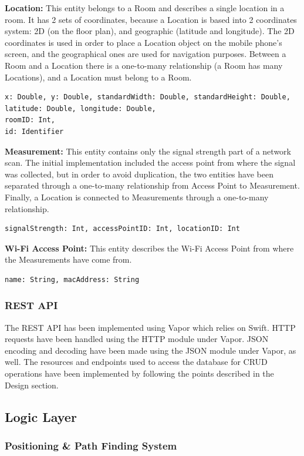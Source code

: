 \noindent
\textbf{Location: }This entity belongs to a Room and describes a single location in a room. It has 2 sets of coordinates, because a Location is based into 2 coordinates system: 2D (on the floor plan), and geographic (latitude and longitude). The 2D coordinates is used in order to place a Location object on the mobile phone's screen, and the geographical ones are used for navigation purposes. Between a Room and a Location there is a one-to-many relationship (a Room has many Locations), and a Location must belong to a Room.
\begin{lstlisting}
x: Double, y: Double, standardWidth: Double, standardHeight: Double,
latitude: Double, longitude: Double,
roomID: Int,
id: Identifier
\end{lstlisting}

\noindent
\textbf{Measurement: }This entity contains only the signal strength part of a network scan. The initial implementation included the access point from where the signal was collected, but in order to avoid duplication, the two entities have been separated through a one-to-many relationship from Access Point to Measurement. Finally, a Location is connected to Measurements through a one-to-many relationship.
\begin{lstlisting}
signalStrength: Int, accessPointID: Int, locationID: Int
\end{lstlisting}

\noindent
\textbf{Wi-Fi Access Point: }This entity describes the Wi-Fi Access Point from where the Measurements have come from.
\begin{lstlisting}
name: String, macAddress: String
\end{lstlisting}

\subsubsection{REST API}
The REST API has been implemented using Vapor which relies on Swift. HTTP requests have been handled using the HTTP module under Vapor. JSON encoding and decoding have been made using the JSON module under Vapor, as well. The resources and endpoints used to access the database for CRUD operations have been implemented by following the points described in the Design section.

\subsection{Logic Layer}
\subsubsection{Positioning \& Path Finding System}

